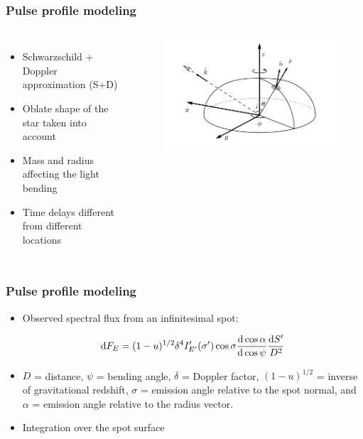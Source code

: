 \documentclass{beamer}
\def\be{\begin{equation}}
\def\ee{\end{equation}}
\def\d{{\rm d}}
\def\Dop{\delta}
\begin{document}
\begin{frame}
\frametitle{Pulse profile modeling}
\begin{columns}[t] %
\begin{itemize}

\item Schwarzschild + Doppler approximation (S+D)
\item Oblate shape of the star taken into account
\item Mass and radius affecting the light bending
\item Time delays different from different locations 

\end{itemize}
\begin{figure}
\includegraphics[width=1.1\linewidth]{fig2.png}
\end{figure}
\end{columns}
\end{frame}



\begin{frame}
\frametitle{Pulse profile modeling}
 
\begin{itemize}

\item Observed spectral flux from an infinitesimal spot:

\be \label{eq:fluxspot2}
\d F_{E}=(1-u)^{1/2} \Dop^{4} I'_{E'}(\sigma') \cos\sigma
\frac{\d \cos\alpha}{\d\cos\psi}
 \frac{\d S'}{D^2} 
\ee

\item $D$ = distance, $\psi$ = bending angle, $\Dop$ = Doppler factor, $(1-u)^{1/2}$ = inverse of gravitational redshift, $\sigma$  = emission angle relative to the spot normal, and $\alpha$  = emission angle relative to the radius vector.
\item Integration over the spot surface
\end{itemize}

\end{frame}
\end{document}
